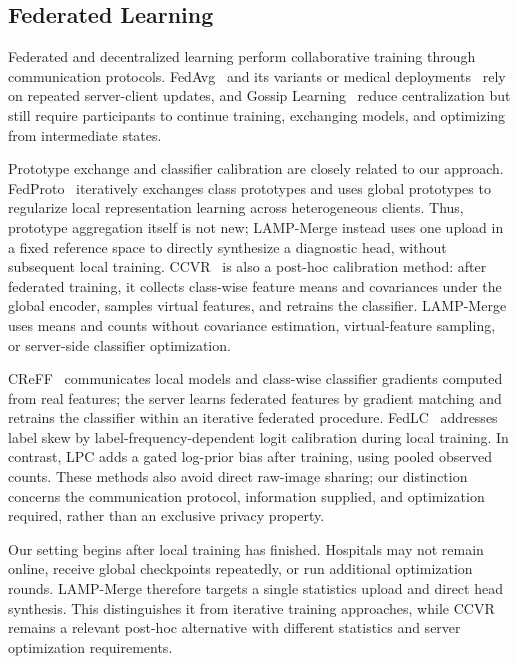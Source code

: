 \documentclass[journal,twoside,web]{ieeecolor}
\begin{document}
\subsection{Federated Learning}

Federated and decentralized learning perform collaborative training through communication protocols. FedAvg~\cite{pmlr-v54-mcmahan17a} and its variants or medical deployments~\cite{li2020fedprox,karimireddy2020scaffold,li2021fedbn,kaissis2020secure,sheller2020federated,rieke2020future,kairouz2021advances,li2021moon,collins2021fedrep} rely on repeated server-client updates, and Gossip Learning~\cite{hegedhus_gossip_2019} reduce centralization but still require participants to continue training, exchanging models, and optimizing from intermediate states.

Prototype exchange and classifier calibration are closely related to our approach. FedProto~\cite{tan2022fedproto} iteratively exchanges class prototypes and uses global prototypes to regularize local representation learning across heterogeneous clients. Thus, prototype aggregation itself is not new; LAMP-Merge instead uses one upload in a fixed reference space to directly synthesize a diagnostic head, without subsequent local training. CCVR~\cite{luo2021ccvr} is also a post-hoc calibration method: after federated training, it collects class-wise feature means and covariances under the global encoder, samples virtual features, and retrains the classifier. LAMP-Merge uses means and counts without covariance estimation, virtual-feature sampling, or server-side classifier optimization.

CReFF~\cite{shang2022creff} communicates local models and class-wise classifier gradients computed from real features; the server learns federated features by gradient matching and retrains the classifier within an iterative federated procedure. FedLC~\cite{zhang2022fedlc} addresses label skew by label-frequency-dependent logit calibration during local training. In contrast, LPC adds a gated log-prior bias after training, using pooled observed counts. These methods also avoid direct raw-image sharing; our distinction concerns the communication protocol, information supplied, and optimization required, rather than an exclusive privacy property.

Our setting begins after local training has finished. Hospitals may not remain online, receive global checkpoints repeatedly, or run additional optimization rounds. LAMP-Merge therefore targets a single statistics upload and direct head synthesis. This distinguishes it from iterative training approaches, while CCVR remains a relevant post-hoc alternative with different statistics and server optimization requirements.
\end{document}
